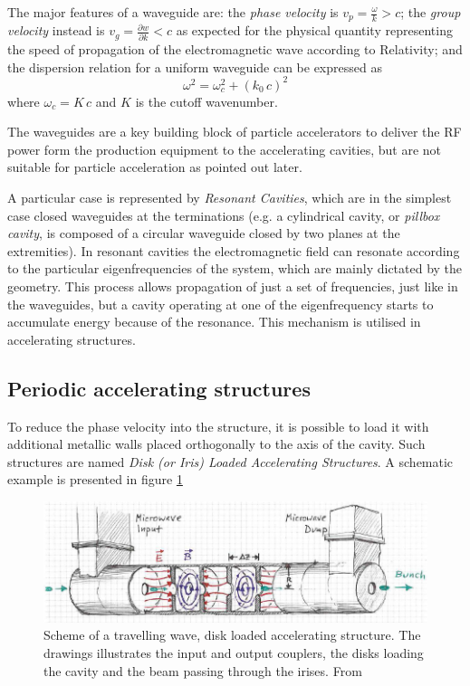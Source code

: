 The major features of a waveguide are: the \textit{phase velocity} is $v_p=\frac{\omega}{k} > c$; the \textit{group velocity} instead is $v_g = \frac{\partial w}{\partial k} < c$ as expected for the physical quantity representing the speed of propagation of the electromagnetic wave according to Relativity; and  the dispersion relation for a uniform waveguide can be expressed as 
\begin{equation}
\omega^2 = \omega^2_c + (k_0 \, c)^2
\end{equation}
where $\omega_c = K \, c$ and $K$ is the cutoff wavenumber.

The waveguides are a key building block of particle accelerators to deliver the RF power form the production equipment to the accelerating cavities, but are not suitable for particle acceleration as pointed out later.

A particular case is represented by \textit{Resonant Cavities}, which are in the simplest case closed waveguides at the terminations (e.g. a cylindrical cavity, or \textit{pillbox cavity}, is composed of a circular waveguide closed by two planes at the extremities). In resonant cavities the electromagnetic field can resonate according to the particular eigenfrequencies of the system, which are mainly dictated by the geometry. This process allows propagation of just a set of frequencies, just like in the waveguides, but a cavity operating at one of the eigenfrequency starts to accumulate energy because of the resonance. This mechanism is utilised in accelerating structures.


\subsection[Periodic accelerating structures]{Periodic accelerating structures}

To reduce the phase velocity into the structure, it is possible to load it with additional metallic walls placed orthogonally to the axis of the cavity.  Such structures are named \textit{Disk (or Iris) Loaded Accelerating Structures}. A schematic example is presented in figure \ref{ACS_scheme}

\begin{figure}[h]
\centering

\includegraphics[scale=0.45]{pictures/scheme_ACS}
\caption{Scheme of a travelling wave, disk loaded accelerating structure. The drawings illustrates the input and output couplers, the disks loading the cavity and the beam passing through the irises. From \cite{streun}}
\label{ACS_scheme}

\end{figure}

